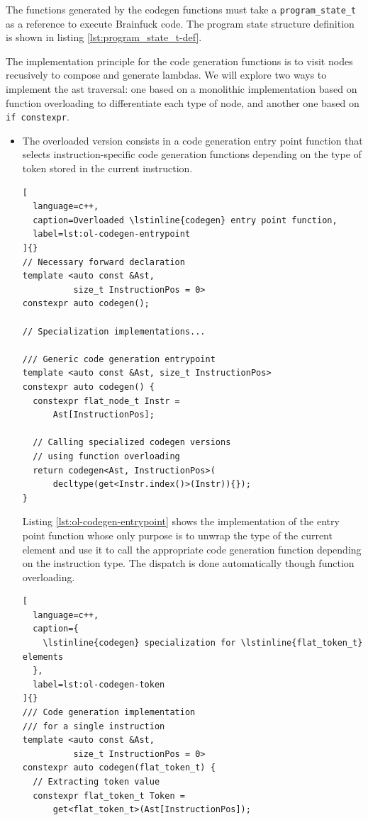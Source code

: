 \documentclass[../main]{subfiles}
\begin{document}
The functions generated by the codegen functions must take a
\lstinline{program_state_t} as a reference to execute Brainfuck code.
The program state structure definition is shown in listing
\ref{lst:program_state_t-def}.

The implementation principle for the code generation functions is to visit
nodes recusively to compose and generate lambdas.
We will explore two ways to implement the \gls{ast} traversal:
one based on a monolithic implementation based on function overloading
to differentiate each type of node, and another one based on
\lstinline{if constexpr}.

\begin{itemize}
\item
The overloaded version consists in a code generation entry point function
that selects instruction-specific code generation functions depending
on the type of token stored in the current instruction.

\begin{lstlisting}[
  language=c++,
  caption=Overloaded \lstinline{codegen} entry point function,
  label=lst:ol-codegen-entrypoint
]{}
// Necessary forward declaration
template <auto const &Ast,
          size_t InstructionPos = 0>
constexpr auto codegen();

// Specialization implementations...

/// Generic code generation entrypoint
template <auto const &Ast, size_t InstructionPos>
constexpr auto codegen() {
  constexpr flat_node_t Instr =
      Ast[InstructionPos];

  // Calling specialized codegen versions
  // using function overloading
  return codegen<Ast, InstructionPos>(
      decltype(get<Instr.index()>(Instr)){});
}
\end{lstlisting}

Listing \ref{lst:ol-codegen-entrypoint} shows the implementation
of the entry point function whose only purpose is to unwrap the type
of the current element and use it to call the appropriate code generation
function depending on the instruction type.
The dispatch is done automatically though function overloading.

\begin{lstlisting}[
  language=c++,
  caption={
    \lstinline{codegen} specialization for \lstinline{flat_token_t} elements
  },
  label=lst:ol-codegen-token
]{}
/// Code generation implementation
/// for a single instruction
template <auto const &Ast,
          size_t InstructionPos = 0>
constexpr auto codegen(flat_token_t) {
  // Extracting token value
  constexpr flat_token_t Token =
      get<flat_token_t>(Ast[InstructionPos]);


\end{lstlisting}
\end{itemize}
\end{document}
